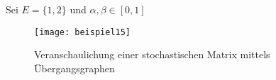 Sei $E = \lbrace 1,2 \rbrace$ und $\alpha, \beta \in [0,1]$
\begin{figure}[H]
\texttt{[image: beispiel15]}
\caption{Veranschaulichung einer stochastischen Matrix mittels Übergangsgraphen}
\end{figure}